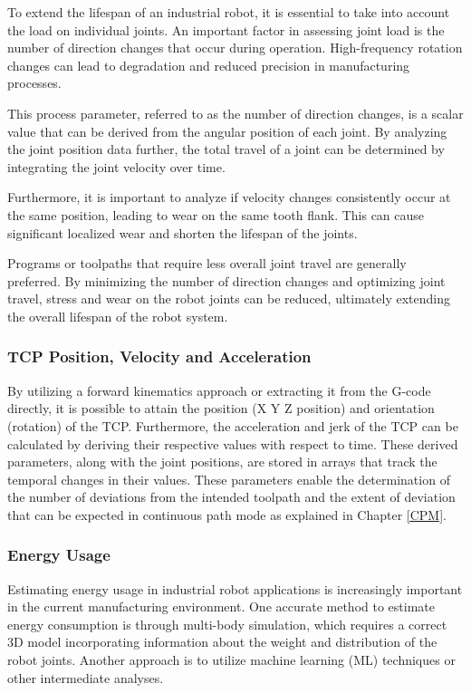 To extend the lifespan of an industrial robot, it is essential to take into account the load on individual joints. An important factor in assessing joint load is the number of direction changes that occur during operation. High-frequency rotation changes can lead to degradation and reduced precision in manufacturing processes.

This process parameter, referred to as the number of direction changes, is a scalar value that can be derived from the angular position of each joint. By analyzing the joint position data further, the total travel of a joint can be determined by integrating the joint velocity over time.

Furthermore, it is important to analyze if velocity changes consistently occur at the same position, leading to wear on the same tooth flank. This can cause significant localized wear and shorten the lifespan of the joints.

Programs or toolpaths that require less overall joint travel are generally preferred. By minimizing the number of direction changes and optimizing joint travel, stress and wear on the robot joints can be reduced, ultimately extending the overall lifespan of the robot system.

\subsubsection*{TCP Position, Velocity and Acceleration}
By utilizing a forward kinematics approach or extracting it from the G-code directly, it is possible to attain the position (X Y Z position) and orientation (rotation) of the \acrshort{TCP}. Furthermore, the acceleration and jerk of the \acrshort{TCP} can be calculated by deriving their respective values with respect to time. These derived parameters, along with the joint positions, are stored in arrays that track the temporal changes in their values. These parameters enable the determination of the number of deviations from the intended toolpath and the extent of deviation that can be expected in continuous path mode as explained in Chapter \ref{CPM}.


\subsubsection*{Energy Usage}
Estimating energy usage in industrial robot applications is increasingly important in the current manufacturing environment. One accurate method to estimate energy consumption is through multi-body simulation, which requires a correct 3D model incorporating information about the weight and distribution of the robot joints. Another approach is to utilize machine learning (ML) techniques or other intermediate analyses.

